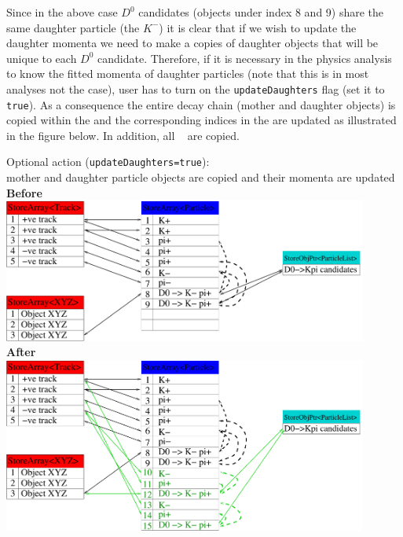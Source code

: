 Since in the above case $D^0$ candidates (\particle objects under index 8 and 9) share the same daughter particle (the $K^-$) it is clear
that if we wish to update the daughter momenta we need to make a copies of daughter \particle objects that will be unique to each $D^0$
candidate. Therefore, if it is necessary in the physics analysis to know the fitted momenta of daughter particles (note that this is
in most analyses not the case), user has to turn on the {\tt updateDaughters} flag (set it to {\tt true}). As a consequence the entire 
decay chain (mother and daughter \particle objects) is copied within the  and the corresponding indices in the
 are updated as illustrated in the figure below. In addition, all \basf\  are copied.

\newpage
\begin{center}
 {\color{red} Optional action ({\tt updateDaughters=true}):}\\
{\color{darkgreen} mother and daughter particle objects are copied and their momenta are updated}\\
\vspace{0.2cm} 
{\bf\large Before}\\
\vspace{0.2cm}
\includegraphics[width=0.9\textwidth]{AnalysisModules/figs/vertexingDataStore.pdf}\\
\vspace{0.2cm}
{\bf\large After}\\
\vspace{0.2cm}
\includegraphics[width=0.9\textwidth]{AnalysisModules/figs/vertexingDataStoreC.pdf}
\end{center}
